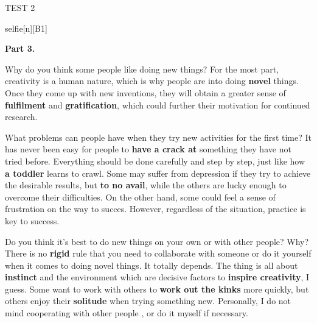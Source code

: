 \begin{glossarymc}[Cambridge 9]
\begin{test}{TEST 2}
\begin{VocabExplain}[Part 2]
            \begin{ExplainCard}{selfie}[n][B1]
            \end{ExplainCard}
        \end{VocabExplain}

    \noindent
    \textbf{Part 3.}
    \begin{qa}{Why do you think some people like doing new things?}
    For the most part, creativity is a human nature, which is why people are into doing \textbf{novel} things. Once they come up with new inventions, they will obtain a greater sense of \textbf{fulfilment} and \textbf{gratification}, which could further their motivation for continued research.
    \end{qa}

    \begin{qa}{What problems can people have when they try new activities for the first time?}
    It has never been easy for people to \textbf{have a crack at} something they have not tried before. Everything should be done carefully and step by step, just like how \textbf{a toddler} learns to crawl. Some may suffer from depression if they try to achieve the desirable results, but \textbf{to no avail}, while the others are lucky enough to overcome their difficulties. On the other hand, some could feel a sense of frustration on the way to succes. However, regardless of the situation, practice is key to success.
    \end{qa}

    \begin{qa}{Do you think it's best to do new things on your own or with other people? Why?}
    There is no \textbf{rigid} rule that you need to collaborate with someone or do it yourself when it comes to doing novel things. It totally depends. The thing is all about \textbf{instinct} and the environment which are decisive factors to \textbf{inspire creativity}, I guess. Some want to work with others to \textbf{work out the kinks} more quickly, but others enjoy their \textbf{solitude} when trying something new. Personally, I do not mind cooperating with other people , or do it myself if necessary.
    \end{qa}


\end{test}
\end{glossarymc}
